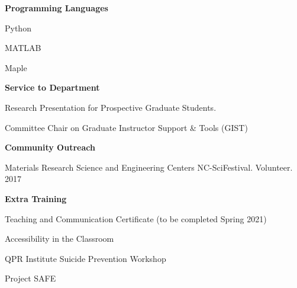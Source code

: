 \documentclass{article}
\begin{document}
\textsf{\textbf{\Large Programming Languages} \hrulefill}

\medskip
Python

\medskip
MATLAB

\medskip
Maple


\bigskip
\bigskip

\textsf{\textbf{\Large Service to Department} \hrulefill}

\medskip
Research Presentation for Prospective Graduate Students.

\medskip
Committee Chair on Graduate Instructor Support \& Tools (GIST)

\bigskip
\bigskip

\textsf{\textbf{\Large Community Outreach} \hrulefill}

\medskip
Materials Research Science and Engineering Centers NC-SciFestival. Volunteer. \hfill 2017 

\bigskip
\bigskip

\textsf{\textbf{\Large Extra Training}\hrulefill}

\medskip
Teaching and Communication Certificate (to be completed Spring 2021)

\medskip
Accessibility in the Classroom

\medskip
QPR Institute Suicide Prevention Workshop

\medskip
Project SAFE




%
%
\end{document}

